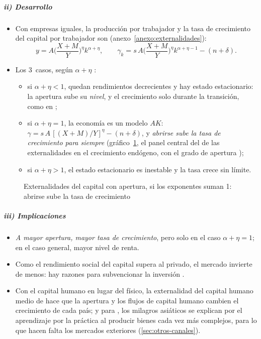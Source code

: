 \documentclass[11pt]{article}
\begin{document}
\subparagraph{ii) Desarrollo}

\begin{itemize}
\item Con empresas iguales, la producción por trabajador y la tasa de crecimiento del capital por trabajador son (anexo~\ref{anexo:externalidades}):
  \[
  y=A\Big(\frac{X+M}{Y}\Big)^{\eta}k^{\alpha+\eta},\qquad \gamma_k=s\,A\Big(\frac{X+M}{Y}\Big)^{\eta}k^{\alpha+\eta-1}-(n+\delta).
  \]
\item Los 3~casos, según $\alpha+\eta$ :
  \begin{itemize}
  \item si $\alpha+\eta<1$, quedan rendimientos decrecientes y hay estado estacionario: la apertura sube su \emph{nivel}, y el crecimiento solo durante la transición, como en ;
  \item si $\alpha+\eta=1$, la economía es un modelo $AK$: $\gamma=s\,A\,[(X+M)/Y]^{\eta}-(n+\delta)$, y \emph{abrirse sube la tasa de crecimiento para siempre} (gráfico~\ref{fig:externalidades-apertura}, el panel central del de las externalidades en el crecimiento endógeno, con el grado de apertura );
  \item si $\alpha+\eta>1$, el estado estacionario es inestable y la tasa crece sin límite.
  \end{itemize}
\end{itemize}
\begin{figure}[H]
\centering
\caption{Externalidades del capital con apertura, si los exponentes suman 1: abrirse sube la tasa de crecimiento}\label{fig:externalidades-apertura}
\end{figure}

\subparagraph{iii) Implicaciones}

\begin{itemize}
\item \emph{A mayor apertura, mayor tasa de crecimiento}, pero solo en el caso $\alpha+\eta=1$; en el caso general, mayor nivel de renta.
\item Como el rendimiento social del capital supera al privado, el mercado invierte de menos: hay razones para subvencionar la inversión .
\item Con el capital humano en lugar del físico, la externalidad del capital humano medio de \textcite{Lucas1988} hace que la apertura y los flujos de capital humano cambien el crecimiento de cada país; y para \textcite{Lucas1993Making}, los milagros asiáticos se explican por el aprendizaje por la práctica al producir bienes cada vez más complejos, para lo que hacen falta los mercados exteriores (\ref{sec:otros-canales}).
\end{itemize}
\end{document}
